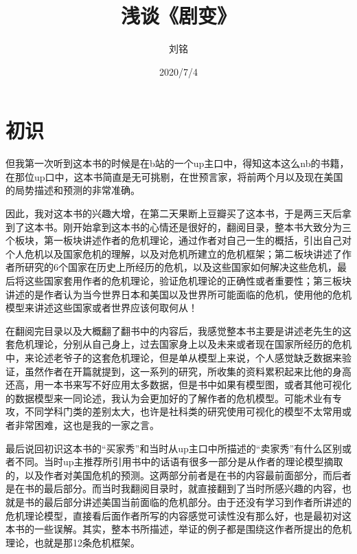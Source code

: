 \documentclass{article}
\title{浅谈《剧变》}
\author{刘铭}
\date{2020/7/4}
\begin{document}
    
    \maketitle
    \setcounter{page}{0}
    \thispagestyle{empty}

    \newpage

    \section{初识}
    但我第一次听到这本书的时候是在b站的一个up主口中，得知这本这么nb的书籍，在那位up口中，这本书简直是无可挑剔，在世预言家，将前两个月以及现在美国的局势描述和预测的非常准确。
    
    因此，我对这本书的兴趣大增，在第二天果断上豆瓣买了这本书，于是两三天后拿到了这本书。刚开始拿到这本书的心情还是很好的，翻阅目录，整本书大致分为三个板块，第一板块讲述作者的危机理论，通过作者对自己一生的概括，引出自己对个人危机以及国家危机的理解，以及对危机所建立的危机框架；第二板块讲述了作者所研究的6个国家在历史上所经历的危机，以及这些国家如何解决这些危机，最后将这些国家套用作者的危机理论，验证危机理论的正确性或者重要性；第三板块讲述的是作者认为当今世界日本和美国以及世界所可能面临的危机，使用他的危机模型来讲述这些国家或者世界应该何取何从！

    在翻阅完目录以及大概翻了翻书中的内容后，我感觉整本书主要是讲述老先生的这套危机理论，分别从自己身上，过去国家身上以及未来或者现在国家所经历的危机中，来论述老爷子的这套危机理论，但是单从模型上来说，个人感觉缺乏数据来验证，虽然作者在开篇就提到，这一系列的研究，所收集的资料累积起来比他的身高还高，用一本书来写不好应用太多数据，但是书中如果有模型图，或者其他可视化的数据模型来一同论述，我认为会更加好的了解作者的危机模型。可能术业有专攻，不同学科门类的差别太大，也许是社科类的研究使用可视化的模型不太常用或者非常困难，这也是我的一家之言。

    最后说回初识这本书的“买家秀”和当时从up主口中所描述的“卖家秀”有什么区别或者不同。当时up主推荐所引用书中的话语有很多一部分是从作者的理论模型摘取的，以及作者对美国危机的预测。这两部分前者是在书的内容最前面部分，而后者是在书的最后部分。而当时我翻阅目录时，就直接翻到了当时所感兴趣的内容，也就是书的最后部分讲述美国当前面临的危机部分。由于还没有学习到作者所讲述的危机理论模型，直接看后面作者所写的内容感觉可读性没有那么好，也是最初对这本书的一些误解。其实，整本书所描述，举证的例子都是围绕这作者所提出的危机理论，也就是那12条危机框架。

    \newpage
\end{document}
